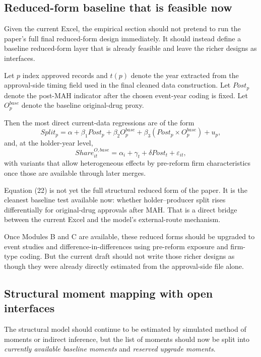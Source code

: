 \documentclass[12pt]{article}
\begin{document}
\subsection{Reduced-form baseline that is feasible now}

Given the current Excel, the empirical section should not pretend to run the paper's full final
reduced-form design immediately. It should instead define a baseline reduced-form layer that is
already feasible and leave the richer designs as interfaces.

Let \(p\) index approved records and \(t(p)\) denote the year extracted from the approval-side timing
field used in the final cleaned data construction. Let \(Post_p\) denote the post-MAH indicator
after the chosen event-year coding is fixed. Let \(O_p^{base}\) denote the baseline original-drug proxy.

Then the most direct current-data regressions are of the form
\begin{equation}
Split_p=\alpha+\beta_1 Post_p+\beta_2 O_p^{base}+\beta_3(Post_p\times O_p^{base})+u_p,
\end{equation}
and, at the holder-year level,
\begin{equation}
Share_{it}^{O,base}=\alpha_i+\gamma_t+\delta Post_t+\varepsilon_{it},
\end{equation}
with variants that allow heterogeneous effects by pre-reform firm characteristics once those are
available through later merges.

Equation (22) is not yet the full structural reduced form of the paper. It is the cleanest baseline
test available now: whether holder--producer split rises differentially for original-drug approvals
after MAH. That is a direct bridge between the current Excel and the model's external-route
mechanism.

Once Modules B and C are available, these reduced forms should be upgraded to event studies and
difference-in-differences using pre-reform exposure and firm-type coding. But the current draft
should not write those richer designs as though they were already directly estimated from the
approval-side file alone.

\subsection{Structural moment mapping with open interfaces}

The structural model should continue to be estimated by simulated method of moments or indirect
inference, but the list of moments should now be split into \emph{currently available baseline
moments} and \emph{reserved upgrade moments}.
\end{document}
